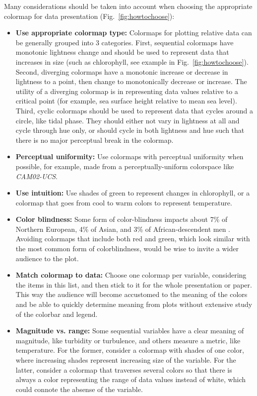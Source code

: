 \documentclass[10pt,journal,compsoc]{IEEEtran}
\begin{document}
Many considerations should be taken into account when choosing the appropriate colormap for data presentation (Fig.~\ref{fig:howtochoose}):
\begin{itemize}
	\item \textbf{Use appropriate colormap type:} Colormaps for plotting relative data can be generally grouped into 3 categories. First, sequential colormaps have monotonic lightness change and should be used to represent data that increases in size (such as chlorophyll, see example in Fig.~\ref{fig:howtochoose}). Second, diverging colormaps have a monotonic increase or decrease in lightness to a point, then change to monotonically decrease or increase. The utility of a diverging colormap is in representing data values relative to a critical point (for example, sea surface height relative to mean sea level). Third, cyclic colormaps should be used to represent data that cycles around a circle, like tidal phase. They should either not vary in lightness at all and cycle through hue only, or should cycle in both lightness and hue such that there is no major perceptual break in the colormap.
	\item \textbf{Perceptual uniformity:} Use colormaps with perceptual uniformity when possible, for example, made from a perceptually-uniform colorspace like \textit{CAM02-UCS}.
	\item \textbf{Use intuition:} Use shades of green to represent changes in chlorophyll, or a colormap that goes from cool to warm colors to represent temperature.
	\item \textbf{Color blindness:} Some form of color-blindness impacts about 7\% of Northern European, 4\% of Asian, and 3\% of African-descendent men \citep{sharpe1999opsin}. Avoiding colormaps that include both red and green, which look similar with the most common form of colorblindness, would be wise to invite a wider audience to the plot.
	\item \textbf{Match colormap to data:} Choose one colormap per variable, considering the items in this list, and then stick to it for the whole presentation or paper. This way the audience will become accustomed to the meaning of the colors and be able to quickly determine meaning from plots without extensive study of the colorbar and legend.
	\item \textbf{Magnitude vs. range:} Some sequential variables have a clear meaning of magnitude, like turbidity or turbulence, and others measure a metric, like temperature. For the former, consider a colormap with shades of one color, where increasing shades represent increasing size of the variable. For the latter, consider a colormap that traverses several colors so that there is always a color representing the range of data values instead of white, which could connote the absense of the variable.
\end{itemize}
\end{document}
